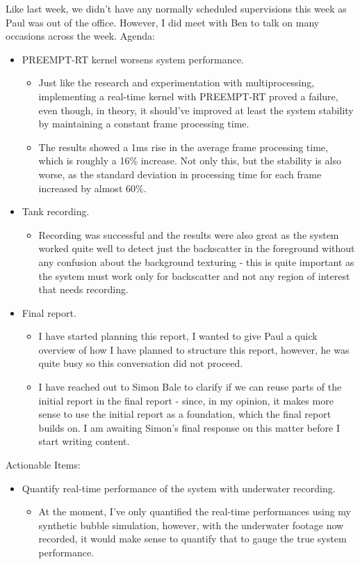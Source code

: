 Like last week, we didn't have any normally scheduled supervisions this week as Paul was out of the office. However, I did meet with Ben to talk on many occasions across the week.
Agenda:

\begin{itemize}
    \item PREEMPT-RT kernel worsens system performance.
    \begin{itemize}
        \item Just like the research and experimentation with multiprocessing, implementing a real-time kernel with PREEMPT-RT proved a failure, even though, in theory, it should've improved at least the system stability by maintaining a constant frame processing time.
        \item The results showed a 1ms rise in the average frame processing time, which is roughly a 16\% increase. Not only this, but the stability is also worse, as the standard deviation in processing time for each frame increased by almost 60\%.
    \end{itemize}

    \item Tank recording.
    \begin{itemize}
        \item Recording was successful and the results were also great as the system worked quite well to detect just the backscatter in the foreground without any confusion about the background texturing - this is quite important as the system must work only for backscatter and not any region of interest that needs recording.
    \end{itemize}

    \item Final report.
    \begin{itemize}
        \item I have started planning this report, I wanted to give Paul a quick overview of how I have planned to structure this report, however, he was quite busy so this conversation did not proceed.
        \item I have reached out to Simon Bale to clarify if we can reuse parts of the initial report in the final report - since, in my opinion, it makes more sense to use the initial report as a foundation, which the final report builds on. I am awaiting Simon's final response on this matter before I start writing content.
    \end{itemize}
\end{itemize}

Actionable Items:

\begin{itemize}
    \item Quantify real-time performance of the system with underwater recording.
    \begin{itemize}
        \item At the moment, I've only quantified the real-time performances using my synthetic bubble simulation, however, with the underwater footage now recorded, it would make sense to quantify that to gauge the true system performance.
    \end{itemize}
\end{itemize}
